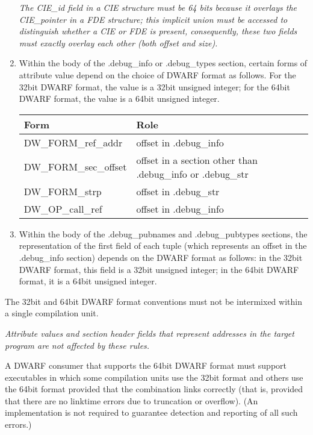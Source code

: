 \begin{enumerate}[1.]
\begin{center}
\begin{tabular}{lll}
\end{tabular}
\end{center}

\textit{The CIE\_id field in a CIE structure must be 64 bits because
it overlays the CIE\_pointer in a FDE structure; this implicit
union must be accessed to distinguish whether a CIE or FDE is
present, consequently, these two fields must exactly overlay
each other (both offset and size).}

\item Within the body of the .debug\_info or .debug\_types
section, certain forms of attribute value depend on the choice
of DWARF format as follows. For the 32\dash bit DWARF format,
the value is a 32\dash bit unsigned integer; for the 64\dash bit DWARF
format, the value is a 64\dash bit unsigned integer.
\begin{center}
\begin{tabular}{lll}
Form & Role  \\ \hline
DW\-\_FORM\-\_ref\-\_addr& offset in .debug\_info \\
DW\-\_FORM\-\_sec\-\_offset& offset in a section other than .debug\_info or .debug\_str \\
DW\-\_FORM\-\_strp&offset in .debug\_str \\
DW\-\_OP\-\_call\-\_ref&offset in .debug\_info \\
\end{tabular}
\end{center}

\item Within the body of the .debug\_pubnames and
.debug\_pubtypes sections, the representation of the first field
of each tuple (which represents an offset in the .debug\_info
section) depends on the DWARF format as follows: in the
32\dash bit DWARF format, this field is a 32\dash bit unsigned integer;
in the 64\dash bit DWARF format, it is a 64\dash bit unsigned integer.

\end{enumerate}


The 32\dash bit and 64\dash bit DWARF format conventions must not be
intermixed within a single compilation unit.

\textit{Attribute values and section header fields that represent
addresses in the target program are not affected by these
rules.}

A DWARF consumer that supports the 64\dash bit DWARF format must
support executables in which some compilation units use the
32\dash bit format and others use the 64\dash bit format provided that
the combination links correctly (that is, provided that there
are no link\dash time errors due to truncation or overflow). (An
implementation is not required to guarantee detection and
reporting of all such errors.)

